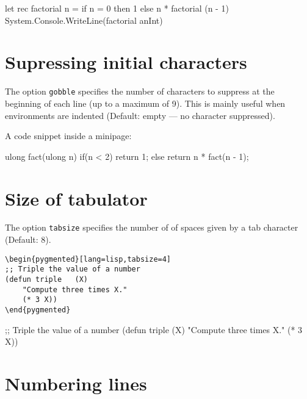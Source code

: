 \documentclass[10pt,a4paper]{article}
\begin{document}
\begin{Example}
\begin{pygmented}[lang=fsharp,colback=green!25]
let rec factorial n = 
    if n = 0 
    then 1 
    else n * factorial (n - 1)
System.Console.WriteLine(factorial anInt)
\end{pygmented}
\end{Example}


\section{Supressing initial characters}

The option \verb|gobble| specifies the number of characters to suppress
at the beginning of each line (up to a maximum of 9). This is mainly
useful when environments are indented (Default: empty — no character
suppressed).

\begin{Example}
A code snippet inside a minipage:
\begin{minipage}[t]{.5\linewidth}
    \begin{pygmented}[lang=d,gobble=8]
        ulong fact(ulong n)
        {
          if(n < 2)
            return 1;
          else
            return n * fact(n - 1);
        }
      \end{pygmented}
\end{minipage}
\end{Example}


\section{Size of tabulator}

The option \verb|tabsize| specifies the number of of spaces given by a
tab character (Default: 8).

\begin{Verbatim}[showtabs,tabsize=1]
\begin{pygmented}[lang=lisp,tabsize=4]
;; Triple the value of a number
(defun triple	(X)
	"Compute three times X."
	(* 3 X))
\end{pygmented}
\end{Verbatim}

\begin{pygmented}[lang=lisp,tabsize=4]
;; Triple the value of a number
(defun triple	(X)
	"Compute three times X."
	(* 3 X))
\end{pygmented}


\section{Numbering lines}
\end{document}
